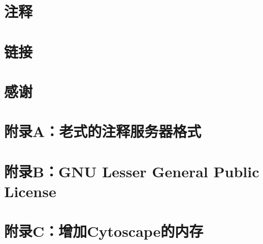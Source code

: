 \documentclass[a4paper, oneside]{book}
\begin{document}
\begin{CJK}{UTF8}{msyh}
\chapter{注释}


\chapter{链接}


\chapter*{感谢}


\chapter*{附录A：老式的注释服务器格式}


\chapter*{附录B：GNU Lesser General Public License}


\chapter*{附录C：增加Cytoscape的内存}


\end{CJK}
\end{document}
